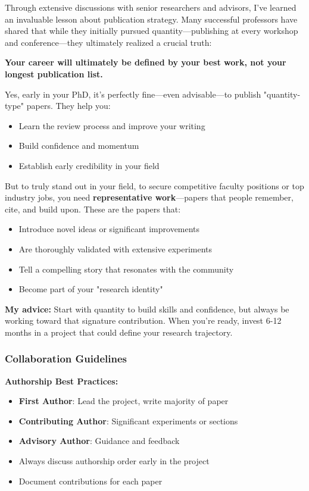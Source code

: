 \documentclass[11pt,a4paper]{article}
\begin{document}
\begin{tcolorbox}[colback=purple!5,colframe=purple!40,title={My Personal Reflection: Quality Over Quantity}]
Through extensive discussions with senior researchers and advisors, I've learned an invaluable lesson about publication strategy. Many successful professors have shared that while they initially pursued quantity—publishing at every workshop and conference—they ultimately realized a crucial truth:

\textbf{Your career will ultimately be defined by your best work, not your longest publication list.}

Yes, early in your PhD, it's perfectly fine—even advisable—to publish "quantity-type" papers. They help you:
\begin{itemize}[leftmargin=1.5em]
    \item Learn the review process and improve your writing
    \item Build confidence and momentum
    \item Establish early credibility in your field
\end{itemize}

But to truly stand out in your field, to secure competitive faculty positions or top industry jobs, you need \textbf{representative work}—papers that people remember, cite, and build upon. These are the papers that:
\begin{itemize}[leftmargin=1.5em]
    \item Introduce novel ideas or significant improvements
    \item Are thoroughly validated with extensive experiments
    \item Tell a compelling story that resonates with the community
    \item Become part of your "research identity"
\end{itemize}

\textbf{My advice:} Start with quantity to build skills and confidence, but always be working toward that signature contribution. When you're ready, invest 6-12 months in a project that could define your research trajectory. 
\end{tcolorbox}

\subsubsection{Collaboration Guidelines}

\textbf{Authorship Best Practices:}
\begin{itemize}
    \item \textbf{First Author}: Lead the project, write majority of paper
    \item \textbf{Contributing Author}: Significant experiments or sections
    \item \textbf{Advisory Author}: Guidance and feedback
    \item Always discuss authorship order early in the project
    \item Document contributions for each paper
\end{itemize}
\end{document}
